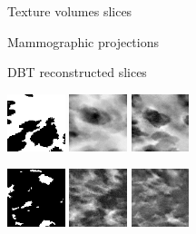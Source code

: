 \documentclass[journal]{IEEEtran}
\begin{document}
\begin{figure}[!htb]
  \centering

  \captionsetup[subfloat]{labelformat=empty}

  \hspace{1mm} \parbox{2.8cm}{\fontsize{9}{9}\selectfont \centering
    Texture volumes slices} \parbox{2.8cm}{\fontsize{9}{9}\selectfont
    \centering Mammographic
    projections} \parbox{2.75cm}{\fontsize{9}{9}\selectfont \centering
    DBT reconstructed slices} \vspace{1mm}

  \includegraphics[width=0.15\textwidth]
  {figure/all/dataset_1/sim_vol_small}
  \includegraphics[width=0.15\textwidth]
  {figure/all/dataset_1/sim_proj}
  \includegraphics[width=0.15\textwidth]
  {figure/all/dataset_1/sim_recon}

  \includegraphics[width=0.15\textwidth]
  {figure/all/dataset_3/sim_vol_small}
  \includegraphics[width=0.15\textwidth]
  {figure/all/dataset_3/sim_proj}
  \includegraphics[width=0.15\textwidth]
  {figure/all/dataset_3/sim_recon}


\end{figure}
\end{document}
